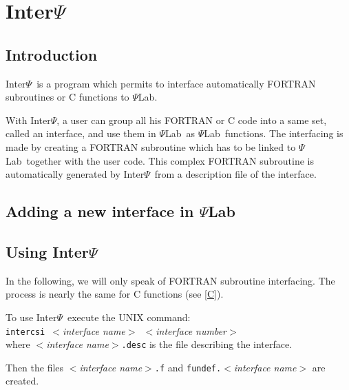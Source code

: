 \chapter{Inter$\Psi$}
\label{intersci}

\newcommand{\version}{Version 2.1}
\newcommand{\ISCI}{Inter$\Psi$}
\newcommand{\SCI}{$\Psi$Lab}
\newcommand{\T}[1]{{\tt #1}}
\newcommand{\M}[1]{$<${\em #1}$>$}
\newcommand{\ie}{\mbox{i.e.}}

\section{Introduction}
\ISCI\ is a program which permits to interface automatically FORTRAN 
subroutines or C functions to \SCI.

With \ISCI, a user can group all his FORTRAN or C code into a same set,
called an interface, and use them in \SCI\ as \SCI\ functions. The interfacing
is made by creating a FORTRAN subroutine which has to be linked to \SCI\ together
with the user code. This complex FORTRAN subroutine is automatically generated
by \ISCI\ from a description file of the interface.

\section{Adding a new interface in \SCI}

\section{Using \ISCI}
In the following, we will only speak of FORTRAN subroutine interfacing. The
process is nearly the same for C functions (see \ref{C}).

\smallskip

To use \ISCI\ execute the UNIX command:\\
\T{intercsi }\M{interface name}\T{\ }\M{interface number}\\
where \M{interface name}\T{.desc} is the file describing the interface.

Then the files \M{interface name}\T{.f} and \T{fundef.}\M{interface name}
are created.

\smallskip

